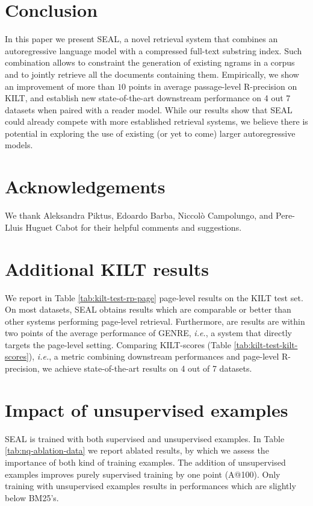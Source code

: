 \documentclass[11pt]{article}
\newcommand{\ie}{\textit{i.e.}}
\newcommand{\system}{\textsc{SEAL}}
\begin{document}
\section{Conclusion}
In this paper we present \system{}, a novel retrieval system that combines an autoregressive language model with a compressed full-text substring index. Such combination allows to constraint the generation of existing ngrams in a corpus and to jointly retrieve all the documents containing them.
Empirically, we show an improvement of more than $10$ points in average passage-level R-precision on KILT, and establish new state-of-the-art downstream performance on 4 out 7 datasets when paired with a reader model. 
While our results show that \system{} could already compete with more established retrieval systems, we believe there is potential in exploring the use of existing (or yet to come) larger autoregressive models.


\section*{Acknowledgements}
We thank Aleksandra Piktus, Edoardo Barba, Niccolò Campolungo, and Pere-Lluis Huguet Cabot for their helpful comments and suggestions.




\FloatBarrier


\appendix



\FloatBarrier

\section{Additional KILT results}
\label{sec:additional-kilt}
We report in Table \ref{tab:kilt-test-rp-page} page-level results on the KILT test set. On most datasets, \system{} obtains results which are comparable or better than other systems performing page-level retrieval. Furthermore, are results are within two points of the average performance of GENRE, \ie, a system that directly targets the page-level setting. Comparing KILT-scores (Table \ref{tab:kilt-test-kilt-scores}), \ie, a metric combining downstream performances and page-level R-precision, we achieve state-of-the-art results on 4 out of 7 datasets.

\section{Impact of unsupervised examples}
\system{} is trained with both supervised and unsupervised examples. In Table \ref{tab:nq-ablation-data} we report ablated results, by which we assess the importance of both kind of training examples. The addition of unsupervised examples improves purely supervised training by one point (A@100). Only training with unsupervised examples results in performances which are slightly below BM25's.

\end{document}
